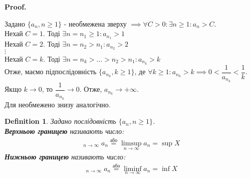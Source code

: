 \documentclass[a4paper, 14pt]{article}
\makeatletter
\DeclareMathOperator*\uplim{\overline{lim}}
\DeclareMathOperator*\downlim{\underline{lim}}
\def\qed{$\blacksquare$}
\theoremstyle{theoremdd}
\theoremstyle{theoremdd}
\newtheorem{definition}[theorem]{Definition}
\theoremstyle{theoremdd}
\theoremstyle{theoremdd}
\theoremstyle{theoremdd}
\theoremstyle{theoremdd}
\theoremstyle{theoremdd}
\theoremstyle{theoremdd}
\renewenvironment{proof}[1][Proof.\\]{\par
\pushQED{\hfill \qed}%
\normalfont \topsep6\p@\@plus6\p@\relax
\trivlist
\item\relax
{\bfseries
#1\@addpunct{.}}\hspace\labelsep\ignorespaces
}{%
\popQED\endtrivlist\@endpefalse
}
\makeatother
\begin{document}
	\begin{proof}
	Задано $\{a_n, n \geq 1\}$ - необмежена зверху $\implies \forall C > 0: \exists n \geq 1: a_n > C$.\\
	Нехай $C = 1$. Тоді $\exists n = n_1 \geq 1: a_{n_1} > 1$\\
	Нехай $C = 2$. Тоді $\exists n = n_2 > n_1: a_{n_2} > 2$\\
	$\vdots$\\
	Нехай $C = k$. Тоді $\exists n = n_k > \dots > n_2 > n_1: a_{n_k} > k$\\
	Отже, маємо підпослідовність $\{a_{n_k}, k \geq 1\}$, де $\forall k \geq 1: a_{n_k} > k \implies 0 <\dfrac{1}{a_{n_k}} < \dfrac{1}{k}$.\\
	Якщо $k \to 0$, то $\dfrac{1}{a_{n_k}} \to 0$. Отже, $a_{n_k} \to +\infty$.\bigskip \\
	Для необмежено знизу аналогічно.
	\end{proof}
	
	\begin{definition} Задано послідовність $\{a_n, n \geq 1\}$.\\
	\textbf{Верхньою границею} називають число:
	\begin{align*}
	\displaystyle \uplim_{n \to \infty} a_n \overset{\textrm{або}}{=} \limsup_{n \to \infty} a_n = \sup X
	\end{align*}
	\textbf{Нижньою границею} називають число:
	\begin{align*}
	\displaystyle \downlim_{n \to \infty} a_n \overset{\textrm{або}}{=} \liminf_{n \to \infty} a_n = \inf X
	\end{align*}
	\end{definition}
	
\end{document}
